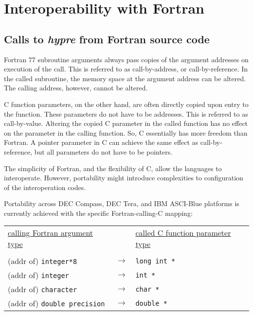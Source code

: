 \chapter{Interoperability with Fortran}

\section{Calls to {\slshape hypre} from Fortran source code}

Fortran 77 subroutine arguments always pass copies of the argument addresses
on execution of the call.  This is referred to as call-by-address, or
call-by-reference.  In the called subroutine, the memory space at the
argument address can be altered.  The calling address, however, cannot be
altered.

C function parameters, on the other hand, are often directly copied upon
entry to the function.  These parameters do not have to be addresses.
This is referred to as call-by-value.  Altering the copied C parameter in the
called function has no effect on the parameter in the calling function.  So,
C essentially has more freedom than Fortran.  A pointer parameter in C can
achieve the same effect as call-by-reference, but all parameters do not have
to be pointers.

The simplicity of Fortran, and the flexibility of C, allow the languages to
interoperate.  However, portability might introduce complexities to
configuration of the interoperation codes.

Portability across DEC Compass, DEC Tera, and IBM ASCI-Blue platforms is
currently achieved with the specific Fortran-calling-C mapping: 

\vspace{0.2in}

\begin{tabular}{lcl}

\underline{calling Fortran argument type} & &
\underline{called C function parameter type} \\
                              &                   &   \\
\hspace{0.1in} (addr of) \verb+integer*8+        & $\longrightarrow$ &
\hspace{0.5in} \verb+long int *+ \\
\hspace{0.1in} (addr of) \verb+integer+          & $\longrightarrow$ &
\hspace{0.5in} \verb+int *+ \\
\hspace{0.1in} (addr of) \verb+character+        & $\longrightarrow$ &
\hspace{0.5in} \verb+char *+ \\
\hspace{0.1in} (addr of) \verb+double precision+ & $\longrightarrow$ &
\hspace{0.5in} \verb+double *+ \\

\end{tabular}

